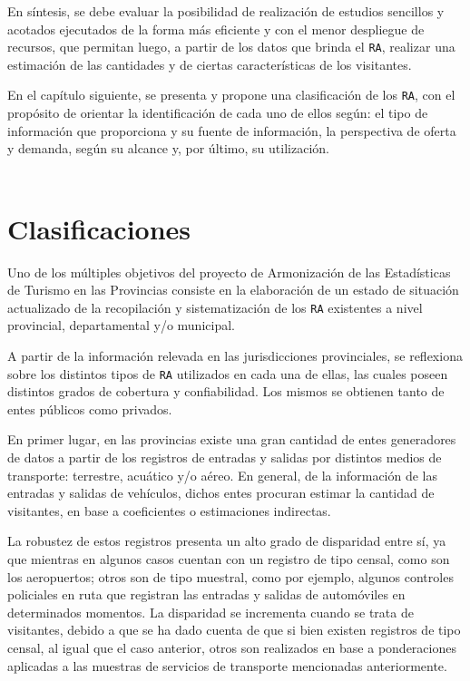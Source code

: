 \documentclass[
]{book}
\begin{document}
En síntesis, se debe evaluar la posibilidad de realización de estudios sencillos y acotados ejecutados de la forma más eficiente y con el menor despliegue de recursos, que permitan luego, a partir de los datos que brinda el \texttt{RA}, realizar una estimación de las cantidades y de ciertas características de los visitantes.

En el capítulo siguiente, se presenta y propone una clasificación de los \texttt{RA}, con el propósito de orientar la identificación de cada uno de ellos según: el tipo de información que proporciona y su fuente de información, la perspectiva de oferta y demanda, según su alcance y, por último, su utilización.\\
~\\

\hypertarget{clasificaciones}{%
\chapter{\texorpdfstring{\textbf{Clasificaciones}}{Clasificaciones}}\label{clasificaciones}}

Uno de los múltiples objetivos del proyecto de Armonización de las Estadísticas de Turismo en las Provincias consiste en la elaboración de un estado de situación actualizado de la recopilación y sistematización de los \texttt{RA} existentes a nivel provincial, departamental y/o municipal.

A partir de la información relevada en las jurisdicciones provinciales, se reflexiona sobre los distintos tipos de \texttt{RA} utilizados en cada una de ellas, las cuales poseen distintos grados de cobertura y confiabilidad. Los mismos se obtienen tanto de entes públicos como privados.

En primer lugar, en las provincias existe una gran cantidad de entes generadores de datos a partir de los registros de entradas y salidas por distintos medios de transporte: terrestre, acuático y/o aéreo. En general, de la información de las entradas y salidas de vehículos, dichos entes procuran estimar la cantidad de visitantes, en base a coeficientes o estimaciones indirectas.

La robustez de estos registros presenta un alto grado de disparidad entre sí, ya que mientras en algunos casos cuentan con un registro de tipo censal, como son los aeropuertos; otros son de tipo muestral, como por ejemplo, algunos controles policiales en ruta que registran las entradas y salidas de automóviles en determinados momentos. La disparidad se incrementa cuando se trata de visitantes, debido a que se ha dado cuenta de que si bien existen registros de tipo censal, al igual que el caso anterior, otros son realizados en base a ponderaciones aplicadas a las muestras de servicios de transporte mencionadas anteriormente.
\end{document}
